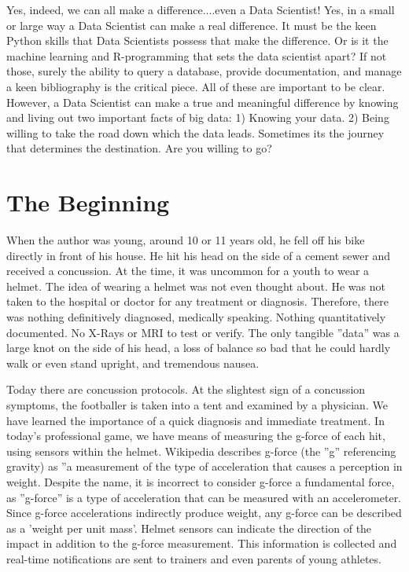 \documentclass[sigconf]{acmart}
\begin{document}
Yes, indeed, we can all make a difference....even a Data Scientist!  Yes, in a small or large way a Data Scientist can make a real difference.  It must be the keen Python skills that Data Scientists possess that make the difference.  Or is it the machine learning and R-programming that sets the data scientist apart?  If not those, surely the ability to query a database, provide documentation, and manage a keen bibliography is the critical piece.  All of these are important to be clear.  However, a Data Scientist can make a true and meaningful difference by knowing and living out two important facts of big data:  1) Knowing your data.  2) Being willing to take the road down which the data leads.  Sometimes its the journey that determines the destination.  Are you willing to go?



\section{The Beginning}

When the author was young, around 10 or 11 years old, he fell off his bike directly in front of his house.  He hit his head on the side of a cement sewer and received a concussion.  At the time, it was uncommon for a youth to wear a helmet.  The idea of wearing a helmet was not even thought about. He was not taken to the hospital or doctor for any treatment or diagnosis.  Therefore, there was nothing definitively diagnosed, medically speaking.   Nothing quantitatively documented.  No X-Rays or MRI to test or verify. The only tangible ''data'' was a large knot on the side of his head, a loss of balance so bad that he could hardly walk or even stand upright, and tremendous nausea.  

Today there are concussion protocols.  At the slightest sign of a concussion symptoms, the footballer is taken into a tent and examined by a physician.  We have learned the importance of a quick diagnosis and immediate treatment.  In today's professional game, we have means of measuring the g-force of each hit, using sensors within the helmet.  Wikipedia describes g-force (the ''g'' referencing gravity) as ''a measurement of the type of acceleration that causes a perception in weight.  Despite the name, it is incorrect to consider g-force a fundamental force, as ''g-force'' is a type of acceleration that can be measured with an accelerometer.  Since g-force accelerations indirectly produce weight, any g-force can be described as a 'weight per unit mass'.  Helmet sensors can indicate the direction of the impact in addition to the g-force measurement.  This information is collected and real-time notifications are sent to trainers and even parents of young athletes.  
\end{document}
